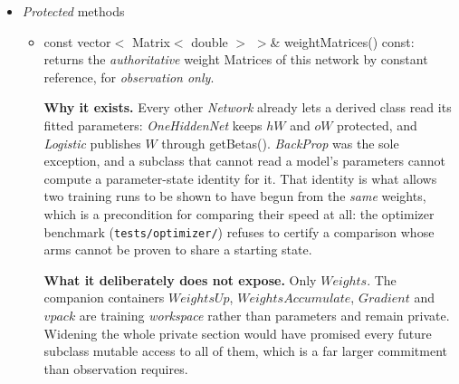 \documentclass{report}
\begin{document}
\begin{itemize}
\begin{itemize}
      virtual method inherited from {\em Network} which is called by
      trainSet() to calculate the gradient and return set error, used
      for automatic stepsize selection
\item virtual void forward( Matrix$<$ double $>$\& $M$, unsigned $n$
      ): Implementation of the pure virtual method inherited from {\em
      Network} which forward propagates for one input row $n$ in a
      Matrix of inputs $M$ (e.g. either the inherited {\em Model}
      Matrix $Train$ or $Test$)
\item virtual void removeInputs( vector$<$ unsigned $>$\&
      $v$ ): Implementation of the pure virtual method which takes as
      its argument a vector of unsigned $v$ representing positions of
      input nodes, and removes those nodes from the {\em BackProp}
      object
\end{itemize}

\item {\em Protected} methods

\begin{itemize}
\item const vector$<$ Matrix$<$ double $>$ $>$\& weightMatrices() const:
      returns the {\em authoritative} weight
      Matrices of this network by constant
      reference, for {\em observation only}.

      {\bf Why it exists.} Every other {\em Network} already lets a derived
      class read its fitted parameters: {\em OneHiddenNet} keeps $hW$ and
      $oW$ protected, and {\em Logistic} publishes $W$ through getBetas().
      {\em BackProp} was the sole exception, and a subclass that cannot read
      a model's parameters cannot compute a parameter-state identity for it.
      That identity is what allows two training runs to be shown to have
      begun from the {\em same} weights, which is a precondition for
      comparing their speed at all: the optimizer benchmark
      (\texttt{tests/optimizer/}) refuses to certify a comparison whose arms
      cannot be proven to share a starting state.

      {\bf What it deliberately does not expose.} Only $Weights$. The
      companion containers $WeightsUp$, $WeightsAccumulate$, $Gradient$ and
      $vpack$ are training {\em workspace} rather than parameters and remain
      private. Widening the whole private section would have promised every
      future subclass mutable access to all of them, which is a far larger
      commitment than observation requires.


\end{itemize}
\end{itemize}
\end{document}
